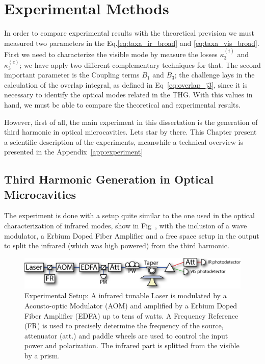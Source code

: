 \chapter{Experimental Methods}
In order to compare experimental results with the theoretical prevision we must measured two parameters in the Eq.\ref{eq:taxa_ir_broad} and \ref{eq:taxa_vis_broad}. First we need to characterize the visible mode by measure the losses $\kappa^(i)_3$ and $\kappa^(e)_3$; we have apply two different complementary techniques for that. The second important parameter is the Coupling terms $B_1$ and $B_3$; the challenge lays in the calculation of the overlap integral, as defined in Eq~\ref{eq:overlap_j3}, since it is necessary to identify the optical modes related in the THG. With this values in hand, we must be able to compare the theoretical and experimental results. 

However, first of all, the main experiment in this dissertation is the generation of third harmonic in optical microcavities. Lets star by there. This Chapter present a scientific description of the experiments, meanwhile a technical overview is presented in the Appendix~\ref{app:experiment}

\section{Third Harmonic Generation in Optical Microcavities}

The experiment is done with a setup quite similar to the one used in the optical characterization of infrared modes, show in Fig~, with the inclusion of a wave modulator, a Erbium Doped Fiber Amplifier and a free space setup in the output to split the infrared (which was high powered) from the third harmonic.
\begin{figure}[h!]
    \centering
    \includegraphics[width = 16 cm]{figuras/Dissertation_thg_setup.jpg}
    \caption{Experimental Setup: A infrared tunable Laser is modulated by a Acousto-optic Modulator (AOM) and amplified by a Erbium Doped Fiber Amplifier (EDFA) up to tens of watts. A Frequency Reference (FR) is used to precisely determine the frequency of the source, attenuator (att.) and paddle wheels are used to control the input power and polarization. The infrared part is splitted from the visible by a prism.}
    \label{fig:thg_setup}
\end{figure}

